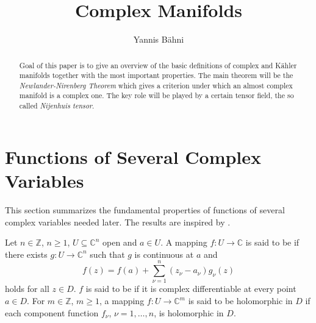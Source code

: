 
\newcommand{\Cscr}{\mathscr{C}}
\newcommand{\op}{\mathrm{op}}
\DeclareMathOperator\End{End}
\DeclareMathOperator\Hom{Hom}
\DeclareMathOperator\Mat{Mat}
\DeclareMathOperator\GL{GL}
\DeclareMathOperator\supp{supp}
\newcommand{\Xfrak}{\mathfrak{X}}
\newcommand{\Ascr}{\mathscr{A}}
\newcommand{\Lup}{\mathrm{L}}

\title{Complex Manifolds}
\author{Yannis B\"ahni}
\address[Yannis B\"ahni]{Universität Zürich, R\"amistrasse 71, 8006 Zurich}


\maketitle
\begin{abstract}
Goal of this paper is to give an overview of the basic definitions of complex and K\"ahler manifolds together with the most important properties. The main theorem will be the \emph{Newlander-Nirenberg Theorem} which gives a criterion under which an almost complex manifold is a complex one. The key role will be played by a certain tensor field, the so called \emph{Nijenhuis tensor}.
\end{abstract}

\tableofcontents

\section{Functions of Several Complex Variables}
This section summarizes the fundamental properties of functions of several complex variables needed later. The results are inspired by \cite[14--30]{grauert:complex_manifolds:2010}.

\begin{definition}
Let $n \in \mathbb{Z}$, $n \geq 1$, $U \subseteq \mathbb{C}^n$ open and $a \in U$. A mapping $f : U \to \mathbb{C}$ is said to be  if there exists $g : U \to \mathbb{C}^n$ such that $g$ is continuous at $a$ and
\begin{equation}
f(z) = f(a) + \sum_{\nu = 1}^n(z_\nu - a_\nu)g_\nu(z)
\end{equation} 
\noindent holds for all $z \in D$. $f$ is said to be  if it is complex differentiable at every point $a \in D$. For $m \in \mathbb{Z}$, $m \geq 1$, a mapping $f : U \to \mathbb{C}^m$ is said to be holomorphic in $D$ if each component function $f_\nu$, $\nu = 1,\dots,n$, is holomorphic in $D$.
\label{def:holomorphic}
\end{definition}

